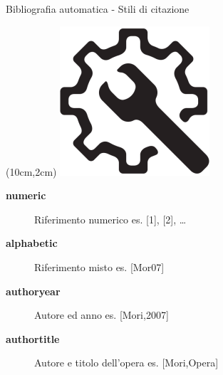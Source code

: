 \begin{frame}{Bibliografia automatica - Stili di citazione}

\begin{textblock*}{2cm}(10cm,2cm)
      \includegraphics[scale=0.28]{res/images/automatic}
\end{textblock*}

\begin{description}
	\item[\textbf{numeric}] Riferimento numerico es. [1], [2], \dots{}
	\item[\textbf{alphabetic}] Riferimento misto es. [Mor07]
	\item[\textbf{authoryear}] Autore ed anno es. [Mori,2007]
	\item[\textbf{authortitle}] Autore e titolo dell'opera es. [Mori,Opera]
\end{description}

\end{frame}